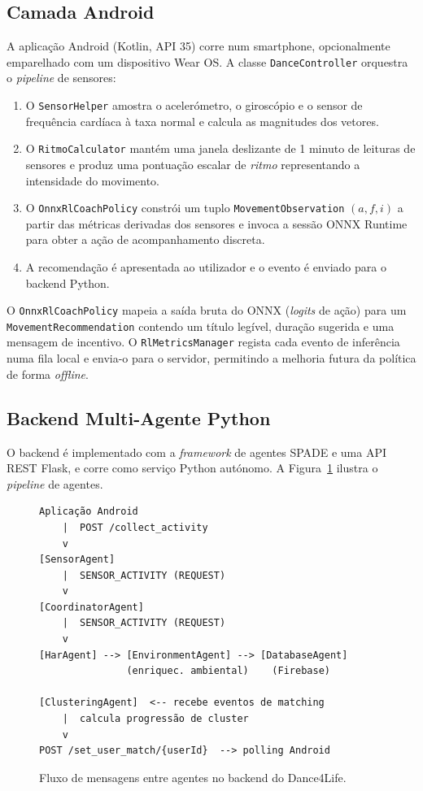 \documentclass[runningheads]{llncs}
\begin{document}
\subsection{Camada Android}

A aplicação Android (Kotlin, API 35) corre num smartphone, opcionalmente emparelhado
com um dispositivo Wear OS. A classe \texttt{DanceController} orquestra o
\emph{pipeline} de sensores:

\begin{enumerate}
  \item O \texttt{SensorHelper} amostra o acelerómetro, o giroscópio e o sensor
        de frequência cardíaca à taxa normal e calcula as magnitudes dos vetores.
  \item O \texttt{RitmoCalculator} mantém uma janela deslizante de 1 minuto de
        leituras de sensores e produz uma pontuação escalar de \emph{ritmo}
        representando a intensidade do movimento.
  \item O \texttt{OnnxRlCoachPolicy} constrói um tuplo
        \texttt{MovementObservation} $(a, f, i)$ a partir das métricas derivadas
        dos sensores e invoca a sessão ONNX Runtime para obter a ação de
        acompanhamento discreta.
  \item A recomendação é apresentada ao utilizador e o evento é enviado para o
        backend Python.
\end{enumerate}

O \texttt{OnnxRlCoachPolicy} mapeia a saída bruta do ONNX (\emph{logits} de ação)
para um \texttt{MovementRecommendation} contendo um título legível, duração
sugerida e uma mensagem de incentivo. O \texttt{RlMetricsManager} regista cada
evento de inferência numa fila local e envia-o para o servidor, permitindo a
melhoria futura da política de forma \emph{offline}.

\subsection{Backend Multi-Agente Python}

O backend é implementado com a \emph{framework} de agentes SPADE e uma API REST
Flask, e corre como serviço Python autónomo. A Figura~\ref{fig:arch} ilustra o
\emph{pipeline} de agentes.

\begin{figure}[h]
\centering
\begin{verbatim}
Aplicação Android
    |  POST /collect_activity
    v
[SensorAgent]
    |  SENSOR_ACTIVITY (REQUEST)
    v
[CoordinatorAgent]
    |  SENSOR_ACTIVITY (REQUEST)
    v
[HarAgent] --> [EnvironmentAgent] --> [DatabaseAgent]
               (enriquec. ambiental)    (Firebase)

[ClusteringAgent]  <-- recebe eventos de matching
    |  calcula progressão de cluster
    v
POST /set_user_match/{userId}  --> polling Android
\end{verbatim}
\caption{Fluxo de mensagens entre agentes no backend do Dance4Life.}
\label{fig:arch}
\end{figure}
\end{document}
